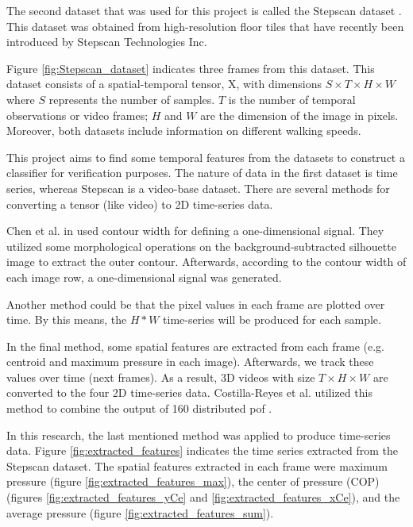 The second dataset that was used for this project is called the Stepscan dataset \cite{Connor2015ComparingBiometrics}. This dataset was obtained from high-resolution floor tiles that have recently been introduced by Stepscan Technologies Inc.

Figure \ref{fig:Stepscan_dataset} indicates three frames from this dataset. This dataset consists of a spatial-temporal tensor, X, with dimensions $S \times T \times H \times W$ where $S$ represents the number of samples. $T$ is the number of temporal observations or video frames; $H$ and $W$ are the dimension of the image in pixels. Moreover, both datasets include information on different walking speeds. 

This project aims to find some temporal features from the datasets to construct a classifier for verification purposes. The nature of data in the first dataset is time series, whereas Stepscan is a video-base dataset. There are several methods for converting a tensor (like video) to 2D time-series data. 

Chen et al. in \cite{Chen2006GaitModel} used contour width for defining a one-dimensional signal. They utilized some morphological operations on the background-subtracted silhouette image to extract the outer contour. Afterwards, according to the contour width of each image row, a one-dimensional signal was generated.

Another method could be that the pixel values in each frame are plotted over time. By this means, the $H * W$ time-series will be produced for each sample.

In the final method, some spatial features are extracted from each frame (e.g. centroid and maximum pressure in each image). Afterwards, we track these values over time (next frames). As a result, 3D videos with size $T \times H \times W$ are converted to the four 2D time-series data. Costilla-Reyes et al. utilized this method to combine the output of 160 distributed \gls{pof} \cite{Costilla-Reyes2018DeepSensors}.

In this research, the last mentioned method was applied to produce time-series data. Figure \ref{fig:extracted_features} indicates the time series extracted from the Stepscan dataset. The spatial features extracted in each frame were maximum pressure (figure \ref{fig:extracted_features_max}), the center of pressure (COP) (figures \ref{fig:extracted_features_yCe} and \ref{fig:extracted_features_xCe}), and the average pressure (figure \ref{fig:extracted_features_sum}). 

